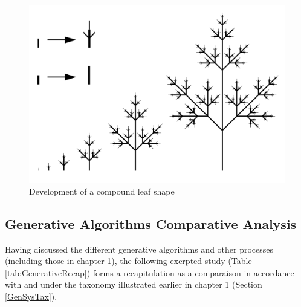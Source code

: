 \begin{figure}[h]
\centering
\includegraphics[width=\textwidth]{./Images/15-L-SystemLeaf}
\caption[L-System Compound Leaf]{Development of a compound leaf shape \cite{csiro96}}
\label{LSysLeaf}
\end{figure}

\subsection{Generative Algorithms Comparative Analysis}

Having discussed the different generative algorithms and other processes (including those in chapter 1), the following exerpted study \cite{khaldi04} (Table \ref{tab:GenerativeRecap}) forms a recapitulation as a comparaison in accordance with and under the taxonomy illustrated earlier in chapter 1 (Section \ref{GenSysTax}).

